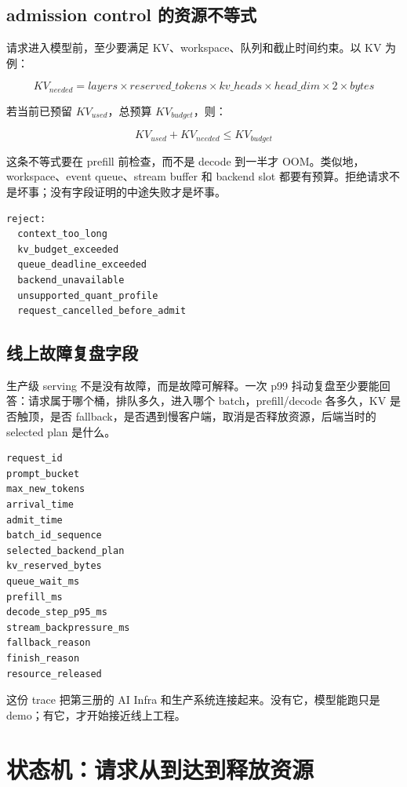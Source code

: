 \subsection{admission control 的资源不等式}

请求进入模型前，至少要满足 KV、workspace、队列和截止时间约束。以 KV 为例：

\[
KV_{needed} = layers \times reserved\_tokens \times kv\_heads \times head\_dim \times 2 \times bytes
\]

若当前已预留 \(KV_{used}\)，总预算 \(KV_{budget}\)，则：

\[
KV_{used} + KV_{needed} \le KV_{budget}
\]

这条不等式要在 prefill 前检查，而不是 decode 到一半才 OOM。类似地，workspace、event queue、stream buffer 和 backend slot 都要有预算。拒绝请求不是坏事；没有字段证明的中途失败才是坏事。

\begin{lstlisting}[numbers=none,caption={admission 失败应给出可行动原因}]
reject:
  context_too_long
  kv_budget_exceeded
  queue_deadline_exceeded
  backend_unavailable
  unsupported_quant_profile
  request_cancelled_before_admit
\end{lstlisting}

\subsection{线上故障复盘字段}

生产级 serving 不是没有故障，而是故障可解释。一次 p99 抖动复盘至少要能回答：请求属于哪个桶，排队多久，进入哪个 batch，prefill/decode 各多久，KV 是否触顶，是否 fallback，是否遇到慢客户端，取消是否释放资源，后端当时的 selected plan 是什么。

\begin{lstlisting}[numbers=none,caption={ServingIncidentTrace 最小字段}]
request_id
prompt_bucket
max_new_tokens
arrival_time
admit_time
batch_id_sequence
selected_backend_plan
kv_reserved_bytes
queue_wait_ms
prefill_ms
decode_step_p95_ms
stream_backpressure_ms
fallback_reason
finish_reason
resource_released
\end{lstlisting}

这份 trace 把第三册的 AI Infra 和生产系统连接起来。没有它，模型能跑只是 demo；有它，才开始接近线上工程。

\section{状态机：请求从到达到释放资源}

